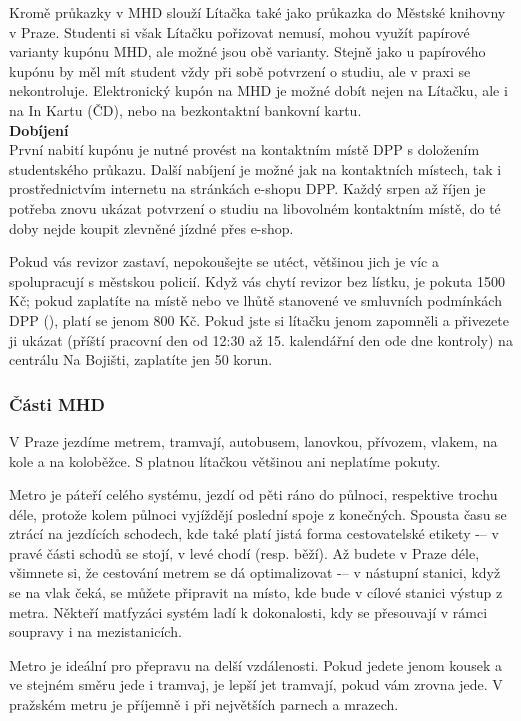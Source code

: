 Kromě průkazky v MHD slouží Lítačka také jako průkazka do Městské knihovny v
Praze. Studenti si však Lítačku pořizovat nemusí, mohou využít papírové varianty
kupónu MHD, ale možné jsou obě varianty. Stejně jako u papírového kupónu by měl
mít student vždy při sobě potvrzení o studiu, ale v praxi se nekontroluje. Elektronický kupón na MHD je možné dobít nejen na Lítačku, ale i na In Kartu (ČD), nebo na bezkontaktní bankovní kartu.
\\
\textbf{Dobíjení}
\\
První nabití kupónu je nutné provést na kontaktním místě DPP s doložením
studentského průkazu. Další nabíjení je možné jak na kontaktních místech, tak i
prostřednictvím internetu na stránkách e-shopu DPP. Každý srpen až říjen je
potřeba znovu ukázat potvrzení o studiu na libovolném kontaktním místě, do té
doby nejde koupit zlevněné jízdné přes e-shop.


Pokud vás revizor zastaví, nepokoušejte se utéct, většinou jich je víc a
spolupracují s městskou policií. Když vás chytí revizor bez lístku, je pokuta
1500 Kč; pokud zaplatíte na místě nebo ve lhůtě stanovené ve smluvních
podmínkách DPP (), platí se
jenom 800 Kč. Pokud jste si lítačku jenom zapomněli a přivezete ji ukázat
(příští pracovní den od 12:30 až 15. kalendářní den ode dne kontroly) na
centrálu Na Bojišti, zaplatíte jen 50 korun.


\subsubsection{Části MHD}
V Praze jezdíme metrem, tramvají, autobusem, lanovkou, přívozem, vlakem, na kole
a na koloběžce. S platnou lítačkou většinou ani neplatíme pokuty.

Metro je páteří celého systému, jezdí od pěti ráno do půlnoci, respektive trochu
déle, protože kolem půlnoci vyjíždějí poslední spoje z konečných. Spousta času
se ztrácí na jezdících schodech, kde také platí jistá forma cestovatelské
etikety -– v pravé části schodů se stojí, v levé chodí (resp. běží). Až budete v
Praze déle, všimnete si, že cestování metrem se dá optimalizovat -– v nástupní
stanici, když se na vlak čeká, se můžete připravit na místo, kde bude v cílové
stanici výstup z metra. Někteří matfyzáci systém ladí k dokonalosti, kdy se
přesouvají v rámci soupravy i na mezistanicích.

Metro je ideální pro přepravu na delší vzdálenosti. Pokud jedete jenom kousek a
ve stejném směru jede i tramvaj, je lepší jet tramvají, pokud vám zrovna jede. V
pražském metru je příjemně i při největších parnech a mrazech.


